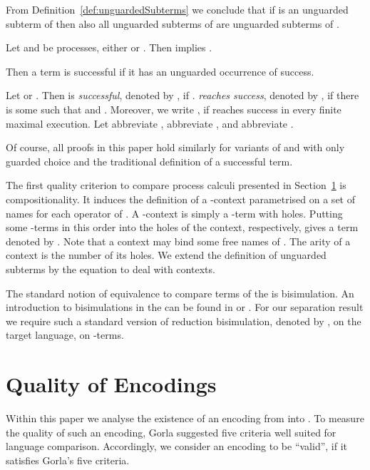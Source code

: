 \documentclass[]{article}
\begin{document}
From Definition~\ref{def:unguardedSubterms} we conclude that if  is an unguarded subterm of  then also all unguarded subterms of  are unguarded subterms of .

\begin{lemma}
	\label{prop:subsetUngSub}
	Let  and  be processes, \ie either  or . Then  implies .
\end{lemma}

Then a term is successful if it has an unguarded occurrence of success.

\begin{definition}
	Let  or . Then  is \emph{successful}, denoted by , if .
	\emph{ reaches success}, denoted by , if there is some  such that  and .
	Moreover, we write , if  reaches success in every finite maximal execution.
Let  abbreviate ,  abbreviate , and  abbreviate .
\end{definition}

\noindent
Of course, all proofs in this paper hold similarly for variants of \piT and \piNM with only guarded choice and the traditional definition of a successful term.

The first quality criterion to compare process calculi presented in Section~\ref{sec:quality} is compositionality. It induces the definition of a \piNM-context parametrised on a set of names for each operator of \piT. A \piNM-context  is simply a \piNM-term with  holes. Putting some \piNM-terms  in this order into the holes  of the context, respectively, gives a term denoted by . Note that a context may bind some free names of . The arity of a context is the number of its holes. We extend the definition of unguarded subterms by the equation  to deal with contexts.

The standard notion of equivalence to compare terms of the \piCal is bisimulation. An introduction to bisimulations in the \piCal can be found \eg in \cite{milnerParrowWalker92} or \cite{sang}. For our separation result we require such a standard version of reduction bisimulation, denoted by , on the target language, \ie on \piNM-terms.



\section{Quality of Encodings}
\label{sec:quality}

Within this paper we analyse the existence of an encoding from \piT into \piNM. To measure the quality of such an encoding, Gorla \cite{gorla} suggested five criteria well suited for language comparison. Accordingly, we consider an encoding to be ``valid'', if it satisfies Gorla's five criteria.
\end{document}
